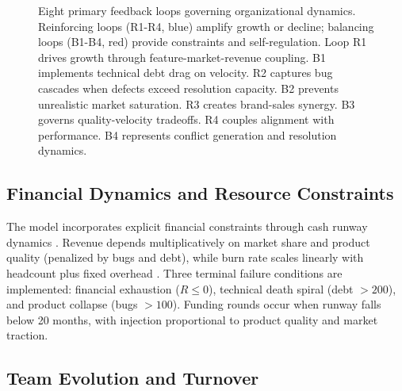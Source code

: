 \documentclass[alpha-refs]{wiley-article}
\begin{document}
\begin{landscape}
\begin{figure}[!htbp]
\vspace{-2cm}
\caption{Eight primary feedback loops governing organizational dynamics. Reinforcing loops (R1-R4, blue) amplify growth or decline; balancing loops (B1-B4, red) provide constraints and self-regulation. Loop R1 drives growth through feature-market-revenue coupling. B1 implements technical debt drag on velocity. R2 captures bug cascades when defects exceed resolution capacity. B2 prevents unrealistic market saturation. R3 creates brand-sales synergy. B3 governs quality-velocity tradeoffs. R4 couples alignment with performance. B4 represents conflict generation and resolution dynamics.}
\label{fig:causal_loops}
\end{figure}
\end{landscape}



\subsection{Financial Dynamics and Resource Constraints}

The model incorporates explicit financial constraints through cash runway dynamics \cite{zali2014system}. Revenue depends multiplicatively on market share and product quality (penalized by bugs and debt), while burn rate scales linearly with headcount plus fixed overhead \cite{madachy2008}. Three terminal failure conditions are implemented: financial exhaustion ($R \leq 0$), technical death spiral (debt $> 200$), and product collapse (bugs $> 100$). Funding rounds occur when runway falls below 20 months, with injection proportional to product quality and market traction.

\subsection{Team Evolution and Turnover}
\end{document}
